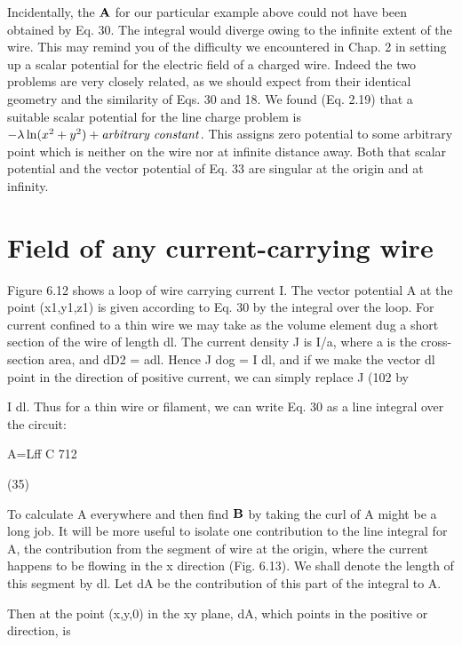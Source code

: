 Incidentally, the $\mathbf{A}$ for our particular example above could not
have been obtained by Eq. 30. The integral would diverge owing to
the infinite extent of the wire. This may remind you of the difficulty
we encountered in Chap. 2 in setting up a scalar potential for the
electric field of a charged wire. Indeed the two problems are very
closely related, as we should expect from their identical geometry
and the similarity of Eqs. 30 and 18. We found (Eq. 2.19) that a suitable
scalar potential for the line charge problem
is $-\lambda\ln(x^2+y^2)+\text{\emph{arbitrary constant}}$.
This assigns zero potential to some arbitrary
point which is neither on the wire nor at infinite distance away. Both
that scalar potential and the vector potential of Eq. 33 are singular
at the origin and at infinity.

\iffalse

\section{Field of any current-carrying wire}

Figure 6.12 shows a loop of wire carrying current I. The vector
potential A at the point (x1,y1,z1) is given according to Eq. 30 by the
integral over the loop. For current confined to a thin wire we may
take as the volume element dug a short section of the wire of length dl.
The current density J is I/a, where a is the cross-section area, and
dD2 = adl. Hence J dog = I dl, and if we make the vector dl point
in the direction of positive current, we can simply replace J (102 by

I dl. Thus for a thin wire or filament, we can write Eq. 30 as a line
integral over the circuit:

\begin{equation}
\end{equation}
A=Lff
C 712

(35)

To calculate A everywhere and then find $\mathbf{B}$ by taking the curl of A
might be a long job. It will be more useful to isolate one contribution
to the line integral for A, the contribution from the segment of
wire at the origin, where the current happens to be flowing in the
x direction (Fig. 6.13). We shall denote the length of this segment
by dl. Let dA be the contribution of this part of the integral to A.

Then at the point (x,y,0) in the xy plane, dA, which points in the
positive or direction, is

